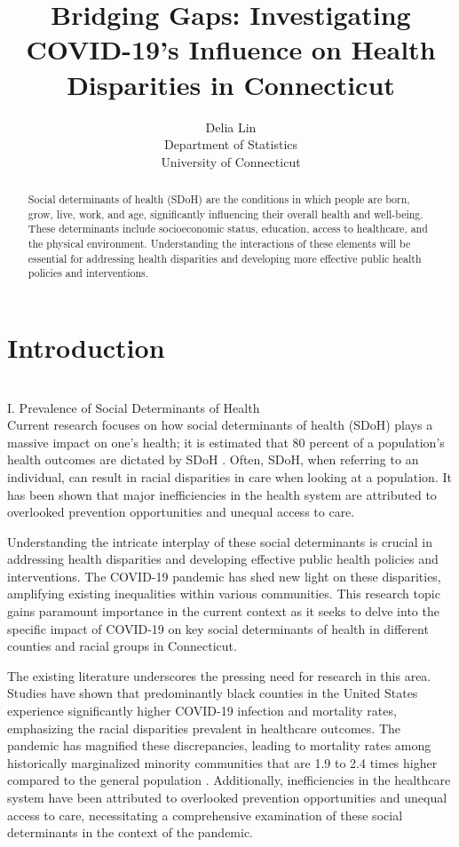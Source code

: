 \documentclass[12pt]{article}
\title{Bridging Gaps: Investigating COVID-19's Influence on Health Disparities in Connecticut}
\author{Delia Lin\\
  Department of Statistics\\
  University of Connecticut
}
\begin{document}
\maketitle

\begin{abstract}
  Social determinants of health (SDoH) are the conditions in which people are born, 
  grow, live, work, and age, significantly influencing their overall health and well-being. 
  These determinants include socioeconomic status, education, access to healthcare, and the 
  physical environment. Understanding the interactions of these elements will be essential for 
  addressing health disparities and developing more effective public health policies and interventions.
\end{abstract}

\section{Introduction}\label{sec:intro}
\\
I. Prevalence of Social Determinants of Health 
\\
Current research focuses on how social determinants of health (SDoH) plays a  massive
impact on one's health; it is estimated that 80 percent of a population's health outcomes are 
dictated by SDoH \citep{HOOD2016129}. Often, SDoH, when referring to an individual, can result in racial 
disparities in care when looking at a population\citep{Monroe2023-uq}. It has been shown that major inefficiencies
in the health system are attributed to overlooked prevention opportunities and unequal access
to care.\citep{Allin2014-xn}

Understanding the intricate interplay of these social determinants is crucial in addressing health disparities 
and developing effective public health policies and interventions. The COVID-19 pandemic has shed new light on 
these disparities, amplifying existing inequalities within various communities. This research topic gains paramount 
importance in the current context as it seeks to delve into the specific impact of COVID-19 on key social determinants 
of health in different counties and racial groups in Connecticut.

The existing literature underscores the pressing need for research in this area. Studies have shown that predominantly 
black counties in the United States experience significantly higher COVID-19 infection and mortality rates, emphasizing 
the racial disparities prevalent in healthcare outcomes. The pandemic has magnified these discrepancies, leading to 
mortality rates among historically marginalized minority communities that are 1.9 to 2.4 times higher compared to the 
general population \citep{Badalov2022-wt}. Additionally, inefficiencies in the healthcare system have been attributed 
to overlooked prevention opportunities and unequal access to care, necessitating a comprehensive examination 
of these social determinants in the context of the pandemic.
\end{document}

